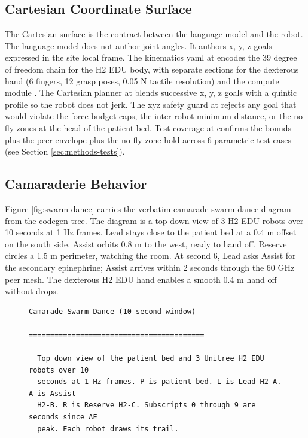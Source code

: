 \begin{sectionaccent}
\subsection{Cartesian Coordinate Surface}
\label{sec:methods-cartesian}

The Cartesian surface is the contract between the language model and
the robot. The language model does not author joint angles. It
authors x, y, z goals expressed in the site local frame. The
kinematics yaml at  encodes the
39 degree of freedom chain for the H2 EDU body, with separate
sections for the dexterous hand (6 fingers, 12 grasp poses, 0.05 N
tactile resolution) and the compute module
\cite{unitree_h2_2026, nvidia_jetson_thor_2026}. The Cartesian
planner at  blends successive x, y, z goals
with a quintic profile so the robot does not jerk. The xyz safety
guard at  rejects any goal that would violate the
force budget caps, the inter robot minimum distance, or the no fly
zones at the head of the patient bed. Test coverage at
 confirms the bounds
plus the peer envelope plus the no fly zone hold across 6 parametric
test cases (see Section \ref{sec:methods-tests}).

\subsection{Camaraderie Behavior}
\label{sec:methods-camaraderie}

Figure \ref{fig:swarm-dance} carries the verbatim camarade swarm
dance diagram from the codegen tree. The diagram is a top down view
of 3 H2 EDU robots over 10 seconds at 1 Hz frames. Lead stays close
to the patient bed at a 0.4 m offset on the south side. Assist orbits
0.8 m to the west, ready to hand off. Reserve circles a 1.5 m
perimeter, watching the room. At second 6, Lead asks Assist for the
secondary epinephrine; Assist arrives within 2 seconds through the
60 GHz peer mesh. The dexterous H2 EDU hand enables a smooth 0.4 m
hand off without drops.

\begin{figure}[H]
\centering
\begin{Verbatim}[fontsize=\footnotesize]
                       Camarade Swarm Dance (10 second window)
                       =========================================

  Top down view of the patient bed and 3 Unitree H2 EDU robots over 10
  seconds at 1 Hz frames. P is patient bed. L is Lead H2-A. A is Assist
  H2-B. R is Reserve H2-C. Subscripts 0 through 9 are seconds since AE
  peak. Each robot draws its trail.


\end{Verbatim}
\end{figure}
\end{sectionaccent}
